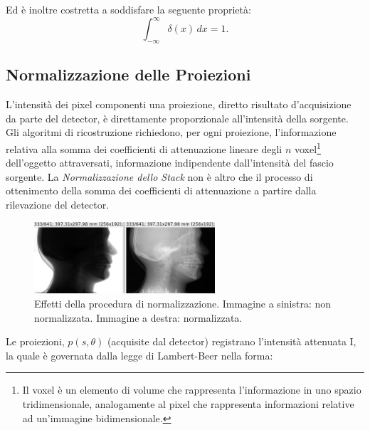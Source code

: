 \documentclass[a4paper,12pt, doubleside]{report}
\begin{document}
                    Ed è inoltre costretta a soddisfare la seguente proprietà:
                    \begin{equation}
                        \int_{-\infty}^\infty \delta(x) \, dx = 1.
                    \end{equation}
            
            \subsection{Normalizzazione delle Proiezioni}
                \label{sec:normalizzazione}
                \par
                    L'intensità dei pixel componenti una proiezione, diretto risultato d'acquisizione da parte del detector, è direttamente proporzionale all'intensità della sorgente. Gli algoritmi di ricostruzione richiedono, per ogni proiezione, l'informazione relativa alla somma dei coefficienti di attenuazione lineare degli $n$ voxel\footnote{Il voxel è un elemento di volume che rappresenta l'informazione in uno spazio tridimensionale, analogamente al pixel che rappresenta informazioni relative ad un'immagine bidimensionale.} dell'oggetto attraversati, informazione indipendente dall'intensità del fascio sorgente. La \textit{Normalizzazione dello Stack} non è altro che il processo di ottenimento della somma dei coefficienti di attenuazione a partire dalla rilevazione del detector.
              
                    \begin{figure}[h]
                        \centering
                        \includegraphics[width=0.6\textwidth]{normalization}
                        \caption{Effetti della procedura di normalizzazione. Immagine a sinistra: non normalizzata. Immagine a destra: normalizzata.}
                        \label{fig:skull-phantom}
                    \end{figure}
                    
                    Le proiezioni, $p(s,\theta)$ (acquisite dal detector) registrano l'intensità attenuata I, la quale è governata dalla legge di Lambert-Beer \cite{lambert-beer} nella forma:
    
\end{document}
